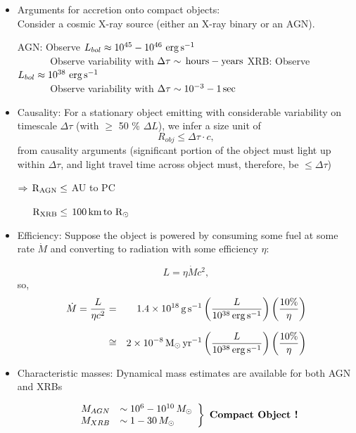 \begin{itemize}
\item Arguments for accretion onto compact objects:\\
Consider a cosmic X-ray source (either an X-ray binary or an AGN).

\subitem AGN: Observe $L_{bol}\approx 10^{45}-10^{46} ~{\rm erg\,s^{-1}}$ \\
     $~~~~~~~~~~~~~~~$Observe variability with $\Delta \tau \sim \rm\,hours - years$
\subitem XRB: Observe $L_{bol}\approx 10^{38} ~{\rm erg\,s^{-1}}$ \\
     $~~~~~~~~~~~~~~~$Observe variability with $\Delta \tau \sim 10^{-3} - 1 \rm\,sec$

\item Causality: For a stationary object emitting with considerable variability on timescale
$\Delta \tau$ (with $\ge$ 50 \% $\Delta L$), we infer a size unit of
\begin{equation}
   R_{obj} \le \Delta \tau \cdot c,
\end{equation}
from causality arguments (significant portion of the object must light up within $\Delta \tau$, and light
travel time across object must, therefore, be $\le \Delta \tau$)

$\Rightarrow \rm\,R_{AGN} \le$ AU to PC

$~~~~\rm\,R_{XRB} \le \, 100\,km\, to~ R_{\odot}$

\item Efficiency: Suppose the object is powered by consuming some fuel at some rate $\dot{M}$ and converting to radiation 
with some efficiency $\eta$:

\begin{equation}
   L = \eta \dot{M} c^{2},
\end{equation}
so,
\begin{eqnarray}
   \dot{M} = \frac{L}{\eta c^{2}} &=& 1.4\times10^{18}\,\unitmflux \left( \frac{L}{10^{38}\,\unitpower} \right) \left( \frac{10\%}{\eta} \right) \nonumnext
                                  &\cong& 2\times10^{-8} \,\unitmfluxsol \left( \frac{L}{10^{38}\, \unitpower} \right) \left( \frac{10\%}{\eta} \right)
\end{eqnarray}

\item Characteristic masses: Dynamical mass estimates are available for both AGN and XRBs

\[ \left. 
\begin{array}{rl}
M_{AGN} & \sim 10^{6} - 10^{10} \, M_{\odot}  \\ 
M_{XRB} & \sim 1 - 30 \, M_{\odot}  
\end{array}
\right\} ~ \textrm{\bf Compact Object !}  \]


\end{itemize}
